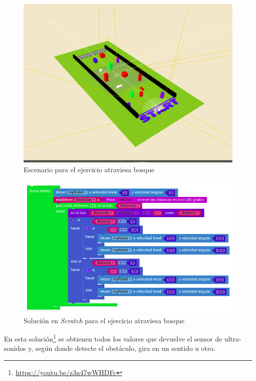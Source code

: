     \begin{figure}[H]
    \centering
    \includegraphics[scale=0.4]{img/atraviesabosque-indiv.png}
    \caption{Escenario para el ejercicio atraviesa bosque} 
    \label{fig:atraviesaBosqueind}
    \end{figure}

    \begin{figure}[H]
    \centering
    \includegraphics[scale=0.3]{img/atraviesaBosqueCodigo.png}
    \caption{Solución en \textit{Scratch} para el ejercicio atraviesa bosque} 
    \label{fig:bosqueSolution}
    \end{figure}
    
    En esta solución\footnote{\url{https://youtu.be/z3n47wWHDFc}} se obtienen todos los valores que devuelve el sensor de ultra-sonidos y, según donde detecte el obstáculo, gira en un sentido u otro.

